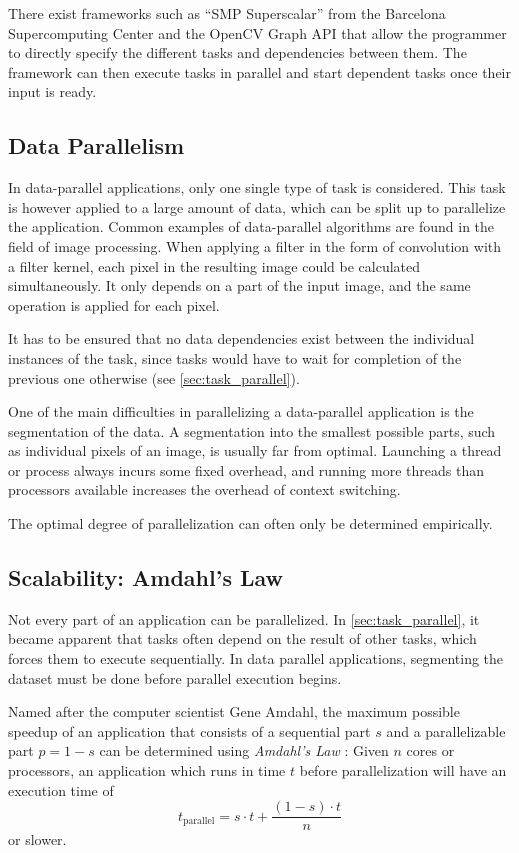 \documentclass[BCOR20mm,DIV14,10pt,headinclude,footexclude,bibtotoc,liststotoc]{article}
\begin{document}
There exist frameworks such as ``SMP Superscalar'' from the Barcelona
Supercomputing Center and the OpenCV Graph API that allow the programmer to
directly specify the different tasks and dependencies between them. The
framework can then execute tasks in parallel and start dependent tasks once
their input is ready.


\subsection{Data Parallelism}
In data-parallel applications, only one single type of task is considered. This
task is however applied to a large amount of data, which can be split up to
parallelize the application. Common examples of data-parallel algorithms are
found in the field of image processing. When applying a filter in the form of
convolution with a filter kernel, each pixel in the resulting image could be
calculated simultaneously. It only depends on a part of the input image, and the
same operation is applied for each pixel.

It has to be ensured that no data dependencies exist between the individual
instances of the task, since tasks would have to wait for completion of the
previous one otherwise (see \cref{sec:task_parallel}).

One of the main difficulties in parallelizing a data-parallel application is the
segmentation of the data. A segmentation into the smallest possible parts, such
as individual pixels of an image, is usually far from optimal. Launching a
thread or process always incurs some fixed overhead, and running more threads
than processors available increases the overhead of context switching. 


The
optimal degree of parallelization can often only be determined empirically.




\subsection{Scalability: Amdahl's Law}
\label{sec:amdahl}
Not every part of an application can be parallelized. In
\cref{sec:task_parallel}, it became apparent that tasks often depend on the
result of other tasks, which forces them to execute sequentially. In data
parallel applications, segmenting the dataset must be done before parallel
execution begins.

Named after the computer scientist Gene Amdahl, the maximum possible speedup of
an application that consists of a sequential part $s$ and a parallelizable part
$p=1-s$ can be determined using \emph{Amdahl's Law} \cite{amdahl1967}: Given $n$
cores or processors, an application which runs in time $t$ before
parallelization will have an execution time of
\begin{equation}
	t_\text{parallel} = s \cdot t + \frac{(1-s)\cdot t}{n}
\end{equation}
or slower.
\end{document}
